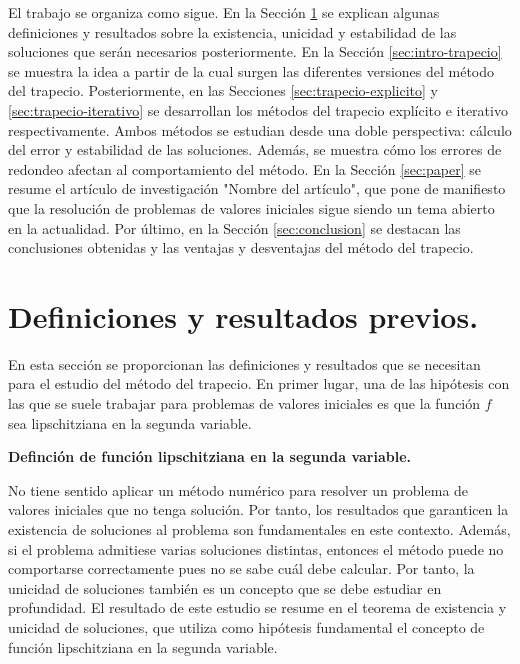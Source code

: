 \documentclass{article}
\theoremstyle{theorem-style}  %
\theoremstyle{definition}
\theoremstyle{example-style}
\begin{document}
	El trabajo se organiza como sigue. En la Sección \ref{sec:previo} se explican algunas definiciones y resultados sobre la existencia, unicidad y estabilidad de las soluciones que serán necesarios posteriormente. En la Sección \ref{sec:intro-trapecio} se muestra la idea a partir de la cual surgen las diferentes versiones del método del trapecio. Posteriormente, en las Secciones \ref{sec:trapecio-explicito} y \ref{sec:trapecio-iterativo} se desarrollan los métodos del trapecio explícito e iterativo respectivamente. Ambos métodos se estudian desde una doble perspectiva: cálculo del error y estabilidad de las soluciones. Además, se muestra cómo los errores de redondeo afectan al comportamiento del método. En la Sección \ref{sec:paper} se resume el artículo de investigación "Nombre del artículo", que pone de manifiesto que la resolución de problemas de valores iniciales sigue siendo un tema abierto en la actualidad. Por último, en la Sección \ref{sec:conclusion} se destacan las conclusiones obtenidas y las ventajas y desventajas del método del trapecio.
	
\section{Definiciones y resultados previos.} \label{sec:previo}
	
	En esta sección se proporcionan las definiciones y resultados que se necesitan para el estudio del método del trapecio. En primer lugar, una de las hipótesis con las que se suele trabajar para problemas de valores iniciales es que la función $f$ sea lipschitziana en la segunda variable.
	
	\textbf{Definción de función lipschitziana en la segunda variable.}
	
	No tiene sentido aplicar un método numérico para resolver un problema de valores iniciales que no tenga solución. Por tanto, los resultados que garanticen la existencia de soluciones al problema son fundamentales en este contexto. Además, si el problema admitiese varias soluciones distintas, entonces el método puede no comportarse correctamente pues no se sabe cuál debe calcular. Por tanto, la unicidad de soluciones también es un concepto que se debe estudiar en profundidad. El resultado de este estudio se resume en el teorema de existencia y unicidad de soluciones, que utiliza como hipótesis fundamental el concepto de función lipschitziana en la segunda variable.
	
\end{document}
